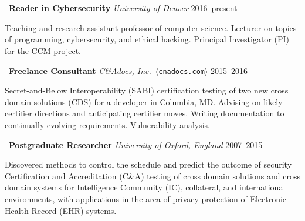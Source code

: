\section*{}

\begin{comment}
\vspace{-10mm}
\emph{Technical programming, cybersecurity, certification and accreditation
of cross domain solutions and systems, cryptography, pentesting, security
research, writing and speaking. Specialist in understanding new government
computer security standards---especially when they're new or have
suddenly changed. Experienced in Common Criteria, DIACAP, NIST SP 800-53
and RMF, DCID 6/3, and DoD 8540.}
\end{comment}

\vspace{-10mm}
\noindent\textbullet\ \textbf{Reader in Cybersecurity}
    \hfill \emph{University of Denver} \hfill 2016--present

    \vspace{1mm}
    \noindent Teaching and research assistant professor of computer science.
    Lecturer on topics of programming, cybersecurity, and ethical hacking.
    Principal Investigator (PI) for the CCM project.

\vspace{3mm}
\noindent\textbullet\ \textbf{Freelance Consultant}
    \hfill \emph{C\&Adocs, Inc.}\ $\langle$\nolinkurl{cnadocs.com}$\rangle$ \hfill 2015--2016

    \vspace{1mm}
    \noindent Secret-and-Below Interoperability (SABI) certification
    testing of two new cross domain solutions (CDS) for a developer in
    Columbia, MD. Advising on likely certifier directions and anticipating
    certifier moves. Writing documentation to continually evolving
    requirements. Vulnerability analysis.

\vspace{2mm}
\noindent\textbullet\ \textbf{Postgraduate Researcher}
    \hfill \emph{University of Oxford, England} \hfill 2007--2015

    \vspace{1mm}
    \noindent Discovered methods to control the schedule and predict the
    outcome of security Certification and Accreditation (C\&A)
    testing of cross domain solutions and cross domain systems for
    Intelligence Community (IC), collateral, and international
    environments, with applications in the area of privacy protection
    of Electronic Health Record (EHR) systems.


